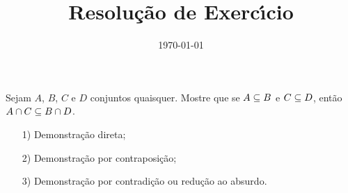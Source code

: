 \documentclass{beamer}
\title{Resolu\c{c}\~ao de Exerc{\'\i}cio}
\author[\autor]{\autor}
\institute[\instituto]{\instituto}
\date{\today}
\begin{document}
    \begin{frame}
        \maketitle
    \end{frame}


    \begin{frame}
        \begin{exercicio}
            Sejam $A$, $B$, $C$ e $D$ conjuntos quaisquer. Mostre que se $A \subseteq B$ e $C \subseteq D$, ent\~ao $A \cap C \subseteq B \cap D$.
        \end{exercicio}
        \vspace{1cm}
        \begin{itemize}
            \item[1)] Demonstra\c{c}\~ao direta;\pause \vspace{1cm}
            \item[2)] Demonstra\c{c}\~ao por contraposi\c{c}\~ao;\pause \vspace{1cm}
            \item[3)] Demonstra\c{c}\~ao por contradi\c{c}\~ao ou redu\c{c}\~ao ao absurdo.\pause \vspace{1cm}
        \end{itemize}
    \end{frame}

    \begin{frame}
        \begin{solucao}
            \vspace{7cm}
        \end{solucao}
    \end{frame}
    \begin{frame}
        \begin{solucao}
            \vspace{7cm}
        \end{solucao}
    \end{frame}
    \begin{frame}
        \begin{solucao}
            \vspace{7cm}
        \end{solucao}
    \end{frame}
\end{document}
